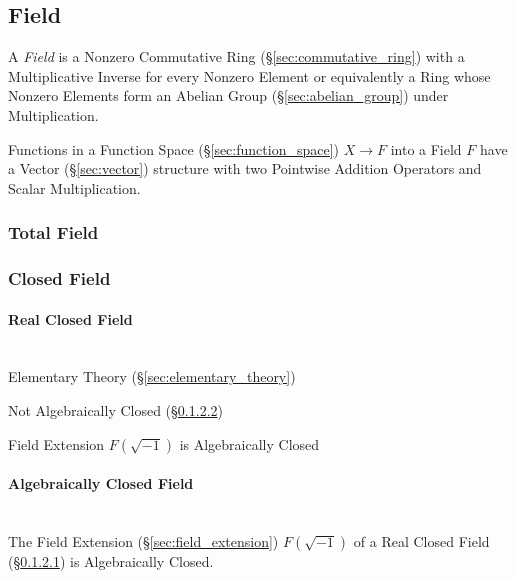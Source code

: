 \subsection{Field}\label{sec:field}

A \emph{Field} is a Nonzero Commutative Ring
(\S\ref{sec:commutative_ring}) with a Multiplicative Inverse for every
Nonzero Element or equivalently a Ring whose Nonzero Elements form an
Abelian Group (\S\ref{sec:abelian_group}) under Multiplication.

Functions in a Function Space (\S\ref{sec:function_space}) $X
\rightarrow F$ into a Field $F$ have a Vector (\S\ref{sec:vector})
structure with two Pointwise Addition Operators and Scalar
Multiplication.



\subsubsection{Total Field}\label{sec:total_field}

\subsubsection{Closed Field}\label{sec:closed_field}

\paragraph{Real Closed Field}\label{sec:real_closed}
\hfill \\

Elementary Theory (\S\ref{sec:elementary_theory})

Not Algebraically Closed (\S\ref{sec:algebraically_closed})

Field Extension $F(\sqrt{-1})$ is Algebraically Closed



\paragraph{Algebraically Closed Field}\label{sec:algebraically_closed}
\hfill \\

The Field Extension (\S\ref{sec:field_extension}) $F(\sqrt{-1})$ of a
Real Closed Field (\S\ref{sec:real_closed}) is Algebraically Closed.



